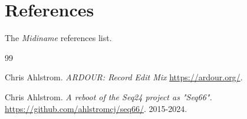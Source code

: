%
%
%

\section{References}
\label{sec:references}

   The \textsl{Midiname} references list.

{\RaggedRight
\begin{thebibliography}{99}

   Chris Ahlstrom.
   \emph{ARDOUR: Record Edit Mix}
   \url{https://ardour.org/}.

   Chris Ahlstrom.
   \emph{A reboot of the Seq24 project as "Seq66".}
   \url{https://github.com/ahlstromcj/seq66/}.
   2015-2024.

\end{thebibliography}
}

